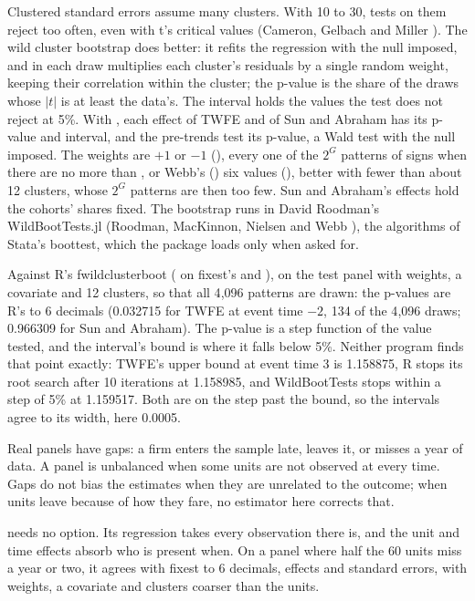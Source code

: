 Clustered standard errors assume many clusters. With 10 to 30, tests on them reject too often, even with t's critical
values (Cameron, Gelbach and Miller ). The wild cluster bootstrap does better: it refits the
regression with the null imposed, and in each draw multiplies each cluster's residuals by a single random weight, keeping
their correlation within the cluster; the p-value is the share of the draws whose $|t|$ is at least the data's. The
interval holds the values the test does not reject at 5\%. With , each effect of TWFE and of Sun and
Abraham has its p-value and interval, and the pre-trends test its p-value, a Wald test with the null imposed. The weights
are $+1$ or $-1$ (), every one of the $2^G$ patterns of signs when there are no more
than , or Webb's () six values (), better with fewer than about 12 clusters,
whose $2^G$ patterns are then too few. Sun and Abraham's effects hold the cohorts' shares fixed. The bootstrap runs in
David Roodman's WildBootTests.jl (Roodman, MacKinnon, Nielsen and Webb ), the algorithms of
Stata's boottest, which the package loads only when asked for.

Against R's fwildclusterboot ( on fixest's  and ), on the test panel with weights, a
covariate and 12 clusters, so that all 4{,}096 patterns are drawn: the p-values are R's to 6 decimals (0.032715 for TWFE
at event time $-2$, 134 of the 4{,}096 draws; 0.966309 for Sun and Abraham). The p-value is a step function of the
value tested, and the interval's bound is where it falls below 5\%. Neither program finds that point exactly: TWFE's
upper bound at event time 3 is 1.158875, R stops its root search after 10 iterations at 1.158985, and WildBootTests
stops within a step of 5\% at 1.159517. Both are on the step past the bound, so the intervals agree to its width, here
0.0005.

Real panels have gaps: a firm enters the sample late, leaves it, or misses a year of data. A panel is unbalanced when
some units are not observed at every time. Gaps do not bias the estimates when they are unrelated to the outcome; when
units leave because of how they fare, no estimator here corrects that.

 needs no option. Its regression takes every observation there is, and the unit and time
effects absorb who is present when. On a panel where half the 60 units miss a year or two, it agrees with fixest to 6
decimals, effects and standard errors, with weights, a covariate and clusters coarser than the units.


